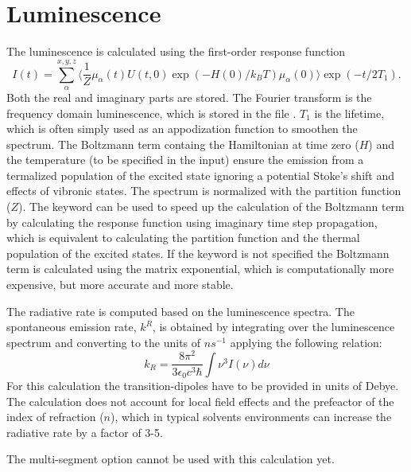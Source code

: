 \section{Luminescence}
The luminescence is calculated using the first-order response function
\begin{equation}
	I(t)=\sum_{\alpha}^{x,y,z}\langle\frac{1}{Z}\mu_{\alpha}(t)U(t,0)\exp(-H(0)/k_BT)\mu_{\alpha}(0)\rangle\exp(-t/2T_1).
\end{equation}
Both the real and imaginary parts are stored.
The Fourier transform is the frequency domain luminescence, which is stored in the file .
$T_1$ is the lifetime, which is often simply used as an appodization function to smoothen the spectrum.
The Boltzmann term containg the Hamiltonian at time zero ($H$) and the temperature (to be specified in the input)
ensure the emission from a termalized population of the excited state ignoring a potential Stoke's shift and effects
of vibronic states. The spectrum is normalized with the partition function ($Z$). 
The  keyword can be used to speed up the calculation of the Boltzmann term by calculating the
response function using imaginary time step propagation, which is equivalent to calculating the partition function
and the thermal population of the excited states. If the keyword is not specified the Boltzmann term is calculated
using the matrix exponential, which is computationally more expensive, but more accurate and more stable.

The radiative rate is computed based on the luminescence spectra. The spontaneous
emission rate, $k^{R}$, is obtained by integrating over the luminescence spectrum and
converting to the units of $ns^{-1}$ applying the following relation:
\begin{equation}
k_R = \frac{8\pi^2 }{3\epsilon_0 c^3 \hbar} \int \nu^3 I(\nu) d\nu
\end{equation}
For this calculation the transition-dipoles have to be provided in units of Debye. The calculation does not account
for local field effects and the prefeactor of the index of refraction ($n$), which in typical solvents environments
can increase the radiative rate by a factor of 3-5.

The multi-segment option cannot be used with this calculation yet.

